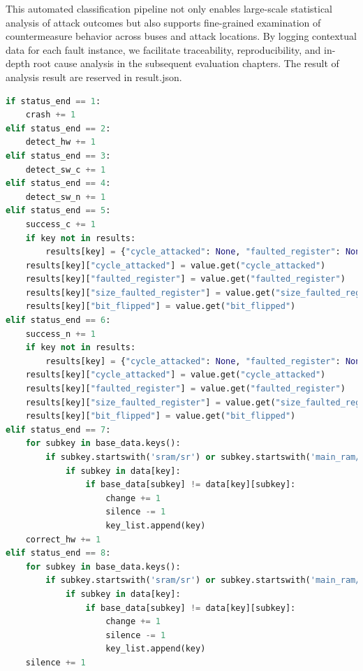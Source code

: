 This automated classification pipeline not only enables large-scale statistical analysis of attack outcomes but also supports fine-grained examination of countermeasure behavior across buses and attack locations. By logging contextual data for each fault instance, we facilitate traceability, reproducibility, and in-depth root cause analysis in the subsequent evaluation chapters. The result of analysis result are reserved in result.json.

\begin{lstlisting}[language=python, caption={analysis.py}, label={analysis}]
if status_end == 1:
    crash += 1
elif status_end == 2:
    detect_hw += 1
elif status_end == 3:
    detect_sw_c += 1
elif status_end == 4:
    detect_sw_n += 1
elif status_end == 5:
    success_c += 1
    if key not in results:
        results[key] = {"cycle_attacked": None, "faulted_register": None, "size_faulted_register": None, "bit_flipped": None}
    results[key]["cycle_attacked"] = value.get("cycle_attacked")
    results[key]["faulted_register"] = value.get("faulted_register")
    results[key]["size_faulted_register"] = value.get("size_faulted_register")
    results[key]["bit_flipped"] = value.get("bit_flipped")    
elif status_end == 6:
    success_n += 1
    if key not in results:
        results[key] = {"cycle_attacked": None, "faulted_register": None, "size_faulted_register": None, "bit_flipped": None}
    results[key]["cycle_attacked"] = value.get("cycle_attacked")
    results[key]["faulted_register"] = value.get("faulted_register")
    results[key]["size_faulted_register"] = value.get("size_faulted_register")
    results[key]["bit_flipped"] = value.get("bit_flipped")                     
elif status_end == 7:
    for subkey in base_data.keys():
        if subkey.startswith('sram/sr') or subkey.startswith('main_ram/mr') or subkey.startswith('storage/st') or subkey.startswith('storage_1/st1'):
            if subkey in data[key]:
                if base_data[subkey] != data[key][subkey]:
                    change += 1
                    silence -= 1
                    key_list.append(key) 
    correct_hw += 1
elif status_end == 8:
    for subkey in base_data.keys():
        if subkey.startswith('sram/sr') or subkey.startswith('main_ram/mr') or subkey.startswith('storage/st') or subkey.startswith('storage_1/st1'):
            if subkey in data[key]:
                if base_data[subkey] != data[key][subkey]:
                    change += 1
                    silence -= 1
                    key_list.append(key)                                                  
    silence += 1
\end{lstlisting}    
